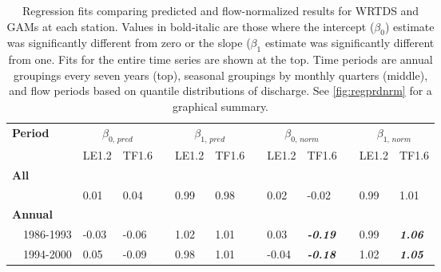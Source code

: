 \documentclass[letterpaper,12pt,oneside]{article}\usepackage[]{graphicx}\usepackage[]{color}
\begin{document}
\begin{table}[!tbp]
\caption{Regression fits comparing predicted and flow-normalized results for \ac{WRTDS} and \acp{GAM} at each station.  Values in bold-italic are those where the intercept ($\beta_0$) estimate was significantly different from zero or the slope ($\beta_{1}$ estimate was significantly different from one. Fits for the entire time series are shown at the top.  Time periods are annual groupings every seven years (top), seasonal groupings by monthly quarters (middle), and flow periods based on quantile distributions of discharge.  See \cref{fig:regprdnrm} for a graphical summary.\label{tab:regprdnrm}} 
\begin{center}
\begin{tabular}{lllcllcllcll}
\hline\hline
\multicolumn{1}{l}{\bfseries Period}&\multicolumn{2}{c}{\bfseries $\beta_{0,\,pred}$}&\multicolumn{1}{c}{\bfseries }&\multicolumn{2}{c}{\bfseries $\beta_{1,\,pred}$}&\multicolumn{1}{c}{\bfseries }&\multicolumn{2}{c}{\bfseries $\beta_{0,\,norm}$}&\multicolumn{1}{c}{\bfseries }&\multicolumn{2}{c}{\bfseries $\beta_{1,\,norm}$}\tabularnewline
\cline{2-3} \cline{5-6} \cline{8-9} \cline{11-12}
\multicolumn{1}{l}{}&\multicolumn{1}{c}{LE1.2}&\multicolumn{1}{c}{TF1.6}&\multicolumn{1}{c}{}&\multicolumn{1}{c}{LE1.2}&\multicolumn{1}{c}{TF1.6}&\multicolumn{1}{c}{}&\multicolumn{1}{c}{LE1.2}&\multicolumn{1}{c}{TF1.6}&\multicolumn{1}{c}{}&\multicolumn{1}{c}{LE1.2}&\multicolumn{1}{c}{TF1.6}\tabularnewline
\hline
{\bfseries All}&&&&&&&&&&&\tabularnewline
~~&0.01&0.04&&0.99&0.98&&0.02&-0.02&&0.99&1.01\tabularnewline
\hline
{\bfseries Annual}&&&&&&&&&&&\tabularnewline
~~1986-1993&-0.03&-0.06&&1.02&1.01&&0.03&{\bf \textit{-0.19}}&&0.99&{\bf \textit{1.06}}\tabularnewline
~~1994-2000&0.05&-0.09&&0.98&1.01&&-0.04&{\bf \textit{-0.18}}&&1.02&{\bf \textit{1.05}}\tabularnewline

\end{tabular}
\end{center}
\end{table}
\end{document}
